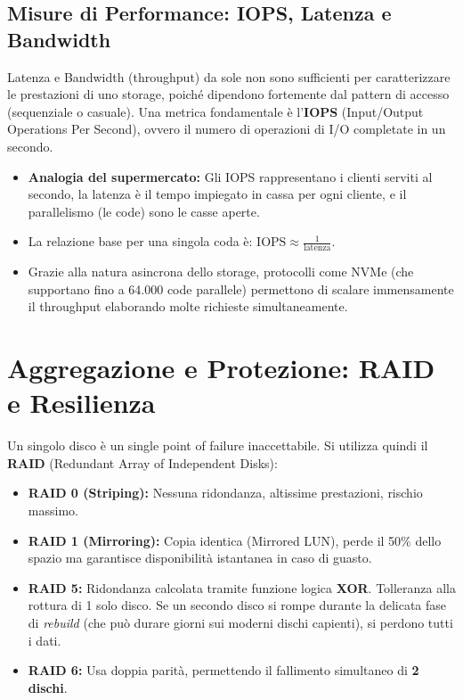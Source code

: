 \subsection{Misure di Performance: IOPS, Latenza e Bandwidth}
Latenza e Bandwidth (throughput) da sole non sono sufficienti per caratterizzare le prestazioni di uno storage, poiché dipendono fortemente dal pattern di accesso (sequenziale o casuale). 
Una metrica fondamentale è l'\textbf{IOPS} (Input/Output Operations Per Second), ovvero il numero di operazioni di I/O completate in un secondo.
\begin{itemize}
    \item \textbf{Analogia del supermercato:} Gli IOPS rappresentano i clienti serviti al secondo, la latenza è il tempo impiegato in cassa per ogni cliente, e il parallelismo (le code) sono le casse aperte.
    \item La relazione base per una singola coda è: $\text{IOPS} \approx \frac{1}{\text{latenza}}$.
    \item Grazie alla natura asincrona dello storage, protocolli come NVMe (che supportano fino a 64.000 code parallele) permettono di scalare immensamente il throughput elaborando molte richieste simultaneamente.
\end{itemize}

\section{Aggregazione e Protezione: RAID e Resilienza}
Un singolo disco è un single point of failure inaccettabile. Si utilizza quindi il \textbf{RAID} (Redundant Array of Independent Disks):
\begin{itemize}
    \item \textbf{RAID 0 (Striping):} Nessuna ridondanza, altissime prestazioni, rischio massimo.
    \item \textbf{RAID 1 (Mirroring):} Copia identica (Mirrored LUN), perde il 50\% dello spazio ma garantisce disponibilità istantanea in caso di guasto.
    \item \textbf{RAID 5:} Ridondanza calcolata tramite funzione logica \textbf{XOR}. Tolleranza alla rottura di 1 solo disco. Se un secondo disco si rompe durante la delicata fase di \textit{rebuild} (che può durare giorni sui moderni dischi capienti), si perdono tutti i dati.
    \item \textbf{RAID 6:} Usa doppia parità, permettendo il fallimento simultaneo di \textbf{2 dischi}.
\end{itemize}

